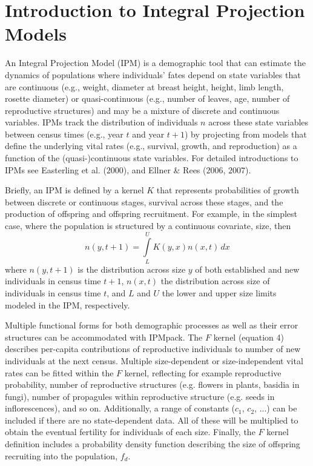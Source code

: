 \documentclass{article}
\begin{document}
\section{Introduction to Integral Projection Models}
An Integral Projection Model (IPM) is a demographic tool that can estimate the
dynamics of populations where individuals' fates depend on state variables that
are continuous (e.g., weight, diameter at breast height, height, limb length,
rosette diameter) or quasi-continuous (e.g., number of leaves, age, number of
reproductive structures) and may be a mixture of discrete and continuous
variables. IPMs track the distribution of individuals $n$ across these state
variables between census times (e.g., year $t$ and year $t+1$) by projecting from models that define the underlying vital rates (e.g., survival, growth, and reproduction) as a function of the (quasi-)continuous state variables. For detailed introductions to IPMs see Easterling et al. ($2000$), and Ellner \& Rees ($2006$, $2007$).

Briefly, an IPM is defined by a kernel $K$ that represents probabilities of growth between discrete or continuous stages, survival across these stages, and the production of offspring and offspring recruitment.  For example, in the simplest case, where the population is structured by a continuous covariate, size, then 
\begin{equation}
n(y, t+1) = \int\limits_{L}^{U} K(y, x) n(x, t) \, dx       
\end{equation}
where $n(y, t+1)$ is the distribution across size $y$ of both established and new individuals in census time $t+1$, $n(x, t)$ the distribution across size of individuals in census time $t$, and $L$ and $U$ the lower and upper size limits modeled in the IPM, respectively. 

Multiple functional forms for both demographic processes as well as their error
structures can be  accommodated with IPMpack. The $F$ kernel (equation 4)
describes per-capita contributions of reproductive individuals to number of new
individuals at the next census. Multiple size-dependent or size-independent
vital rates can be fitted within the $F$ kernel, reflecting for example
reproductive probability, number of reproductive structures (e.g. flowers in
plants, basidia in fungi), number of propagules within reproductive structure
(e.g. seeds in inflorescences), and so on. Additionally, a range of constants
($c_1$, $c_2$, ...) can be included if there are no state-dependent data. All of these will be multiplied to obtain the eventual fertility for individuals of each size. Finally, the $F$ kernel definition includes a probability density function describing the size of offspring recruiting into the population, $f_d$. 
\end{document}
